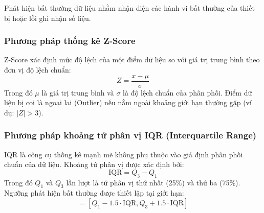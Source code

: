 \documentclass[12pt,a4paper]{article}
\begin{document}
Phát hiện bất thường dữ liệu nhằm nhận diện các hành vi bất thường của thiết bị hoặc lỗi ghi nhận số liệu.

\subsubsection{Phương pháp thống kê Z-Score}
Z-Score xác định mức độ lệch của một điểm dữ liệu so với giá trị trung bình theo đơn vị độ lệch chuẩn:
\begin{equation}
    Z = \frac{x - \mu}{\sigma}
\end{equation}
Trong đó $\mu$ là giá trị trung bình và $\sigma$ là độ lệch chuẩn của phân phối. Điểm dữ liệu bị coi là ngoại lai (Outlier) nếu nằm ngoài khoảng giới hạn thường gặp (ví dụ: $|Z| > 3$).

\subsubsection{Phương pháp khoảng tứ phân vị IQR (Interquartile Range)}
IQR là công cụ thống kê mạnh mẽ không phụ thuộc vào giả định phân phối chuẩn của dữ liệu. Khoảng tứ phân vị được xác định bởi:
\begin{equation}
    \text{IQR} = Q_3 - Q_1
\end{equation}
Trong đó $Q_1$ và $Q_3$ lần lượt là tứ phân vị thứ nhất (25\%) và thứ ba (75\%). Ngưỡng phát hiện bất thường được thiết lập tại giới hạn:
\begin{equation}
    [\text{Lower Bound}, \text{Upper Bound}] = [Q_1 - 1.5 \cdot \text{IQR}, Q_3 + 1.5 \cdot \text{IQR}]
\end{equation}
\end{document}
